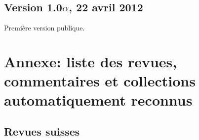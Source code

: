 \documentclass[a4paper]{ltxdockit}[2011/03/25]
\begin{document}
\subsection*{Version 1.0$\alpha$, 22 avril 2012}
Première version publique.


\pagebreak
\section{Annexe: liste des revues, commentaires et collections automatiquement reconnus}

\tablesetup 

\subsection{Revues suisses}\label{listerevues}
\end{document}
